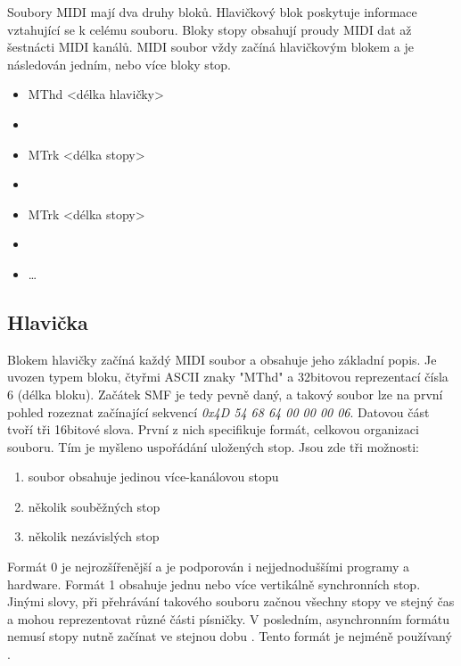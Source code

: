 Soubory MIDI mají dva druhy bloků. 
Hlavičkový blok poskytuje informace vztahující se k celému souboru.
Bloky stopy obsahují proudy MIDI dat až šestnácti MIDI kanálů.
MIDI soubor vždy začíná hlavičkovým blokem 
a je následován jedním, nebo více bloky stop.\cite{Back_SMF_Specif}

\begin{itemize} [label={}]
    \item MThd <délka hlavičky>
    \item <data hlavičky>
    \item MTrk <délka stopy>
    \item <data stopy>
    \item MTrk <délka stopy>
    \item <data stopy>
    \item \dots
\end{itemize}

\subsection{Hlavička}
Blokem hlavičky začíná každý MIDI soubor a obsahuje jeho základní popis.
Je uvozen typem bloku, čtyřmi ASCII znaky "MThd" 
a 32bitovou reprezentací čísla 6 (délka bloku). 
Začátek SMF je tedy pevně daný, 
a takový soubor lze na první pohled rozeznat začínající sekvencí 
\emph{0x4D 54 68 64 00 00 00 06}. 
Datovou část tvoří tři 16bitové slova.
První z nich specifikuje formát, celkovou organizaci souboru.
Tím je myšleno uspořádání uložených stop.
Jsou zde tři možnosti:

\begin{enumerate}\addtocounter{enumi}{-1}
    \item soubor obsahuje jedinou více-kanálovou stopu
    \item několik souběžných stop
    \item několik nezávislých stop
\end{enumerate}

Formát 0 je nejrozšířenější a je podporován i nejjednoduššími programy 
a hardware.
\cite{Back_SMF_Specif}
Formát 1 obsahuje jednu nebo více vertikálně synchronních stop.
Jinými slovy, při přehrávání takového souboru 
začnou všechny stopy ve stejný čas 
a mohou reprezentovat různé části písničky.
V posledním, asynchronním formátu nemusí stopy nutně začínat ve stejnou dobu
\cite{Neznamy_aboutMIDIFiles}.
Tento formát je nejméně používaný
\cite{MIDI_tutorials}.
\par

